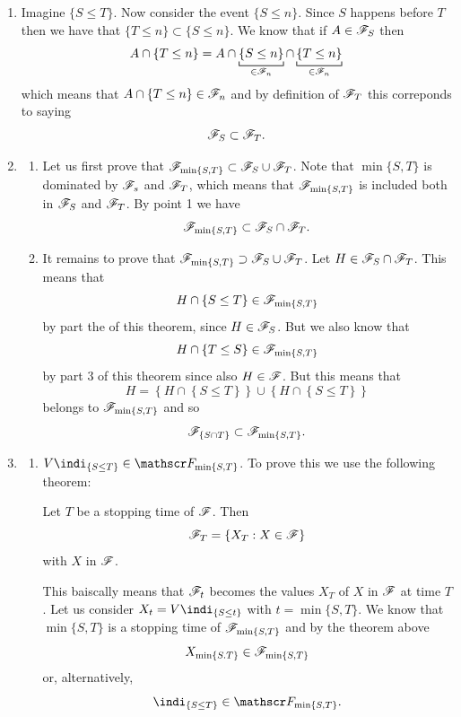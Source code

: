 \documentclass{report}
\begin{document}
\begin{fancyproof}
	\begin{enumerate}
		\item Imagine $\{S\leq T\}$. Now consider the event $\{S\leq n\}$. Since $S$ happens before $T$ then we have that $\{T\leq n\}\subset\{S\leq n\}$. We know that if $A\in\mathscr{F}_S$ then
		\[A\cap\{T\leq n\}=A\cap\underbracket[0.6pt]{\{S\leq n\}}_{\in\F_n}\cap\underbracket[0.6pt]{\{T\leq n\}}_{\in\F_n}\]
		which means that $A\cap\{T\leq n\}\in\mathscr{F}_n$ and by definition of $\mathscr{F}_T$
 this correponds to saying
 \[\mathscr{F}_S\subset\mathscr{F}_T.\]
 \item \begin{enumerate}
 	\item Let us first prove that $\mathscr{F}_{\min\{S,T\}}\subset\mathscr{F}_{S}\cup\mathscr{F}_T$.
 	Note that $\min\{S,T\}$ is dominated by $\mathscr{F}_s$ and $\mathscr{F}_T$, which means that $\mathscr{F}_{\min\{S,T\}}$ is included both in $\mathscr{F}_S$ and $\mathscr{F}_T$. By point 1 we have
 	\[\mathscr{F}_{\min\{S,T\}}\subset\mathscr{F}_S\cap\mathscr{F}_T.\]
 	\item It remains to prove that $\mathscr{F}_{\min\{S,T\}}\supset\mathscr{F}_{S}\cup\mathscr{F}_T$. Let $H\in\mathscr{F}_S\cap\mathscr{F}_T$. This means that 
 	\begin{equation*}
 		H\cap\{S\leq T\}\in\mathscr{F}_{\min\{S,T\}}
 	\end{equation*}
 	by part the of this theorem, since $H\in\mathscr{F}_S$. But we also know that
 	\[H\cap\{T\leq S\}\in\mathscr{F}_{\min\{S,T\}}\]
 	by part 3 of this theorem since also $H\in\mathscr{F}$. But this means that
 	\begin{equation*}
 		H=\left\{H\cap\left\{S\leq T\right\}\right\}\cup\left\{H\cap\left\{S\leq T\right\}\right\}
 	\end{equation*}
 	belongs to $\mathscr{F}_{\min\{S,T\}}$ and so
 	\[\mathscr{F}_{\{S\cap T\}}\subset\mathscr{F}_{\min\{S,T\}}.\]
 \end{enumerate}
 \item\begin{enumerate}
 	\item $V\indi_{\{S\leq T\}}\in\F_{\min\{S,T\}}$. To prove this we use the following theorem:
 	\begin{theorem}
 		Let $T$ be a stopping time of $\mathscr{F}$. Then
 		\[\mathscr{F}_T=\{X_T:X\in\mathscr{F}\}\]
 		with $X$ in $\mathscr{F}$.
 	\end{theorem}
 	This baiscally means that $\mathscr{F}_t$ becomes the values $X_T$ of $X$ in $\mathscr{F}$ at time $T$. Let us consider $X_t=V\indi_{\{S\leq t\}}$ with $t=\min\{S,T\}$. We know that $\min\{S,T\}$ is a stopping time of $\mathscr{F}_{\min\{S,T\}}$ and by the theorem above
 	\[X_{\min\{S.T\}}\in\mathscr{F}_{\min\{S,T\}}\]
 	or, alternatively,
 	\[\indi_{\{S\leq T\}}\in\F_{\min\{S,T\}}.\]

\end{enumerate}
\end{enumerate}
\end{fancyproof}
\end{document}
